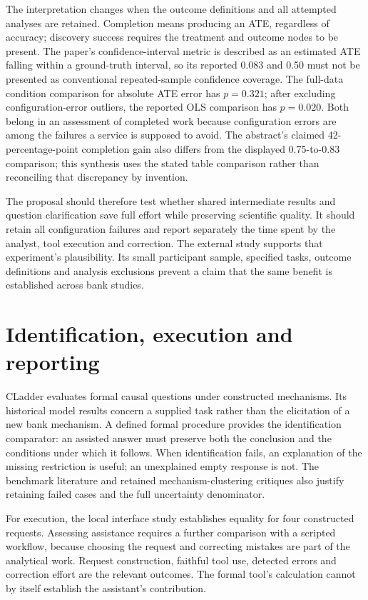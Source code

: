 The interpretation changes when the outcome definitions and all attempted
analyses are retained. Completion means producing an ATE, regardless of
accuracy; discovery success requires the treatment and outcome nodes to be
present. The paper's confidence-interval metric is described as an estimated
ATE falling within a ground-truth interval, so its reported 0.083 and 0.50
must not be presented as conventional repeated-sample confidence coverage.
The full-data condition comparison for absolute ATE error has $p=0.321$;
after excluding configuration-error outliers, the reported OLS comparison
has $p=0.020$. Both belong in an assessment of completed work because
configuration errors are among the failures a service is supposed to avoid.
The abstract's claimed 42-percentage-point completion gain also differs
from the displayed 0.75-to-0.83 comparison; this synthesis uses the stated
table comparison rather than reconciling that discrepancy by invention.
\citep[pp.~1, 5, 17--18]{exec13_census_orca}

The proposal should therefore test whether shared intermediate results and
question clarification save full effort while preserving scientific quality.
It should retain all configuration failures and report separately the time
spent by the analyst, tool execution and correction. The external study
supports that experiment's plausibility. Its small participant sample,
specified tasks, outcome definitions and analysis exclusions prevent a
claim that the same benefit is established across bank studies.

\section{Identification, execution and reporting}
CLadder evaluates formal causal questions under constructed mechanisms. Its
historical model results concern a supplied task rather than the elicitation
of a new bank mechanism. A defined formal procedure provides the identification
comparator: an assisted answer must preserve both the conclusion and the
conditions under which it follows. When identification fails, an explanation
of the missing restriction is useful; an unexplained empty response is not.
The benchmark literature and retained mechanism-clustering critiques also
justify retaining failed cases and the full uncertainty denominator.
\citep{v12_la_2312_04350}

For execution, the local interface study establishes equality for four
constructed requests. Assessing assistance requires a further comparison with
a scripted workflow, because choosing the request and correcting mistakes are
part of the analytical work. Request construction, faithful tool use, detected
errors and correction effort are the relevant outcomes. The formal tool's
calculation cannot by itself establish the assistant's contribution.

